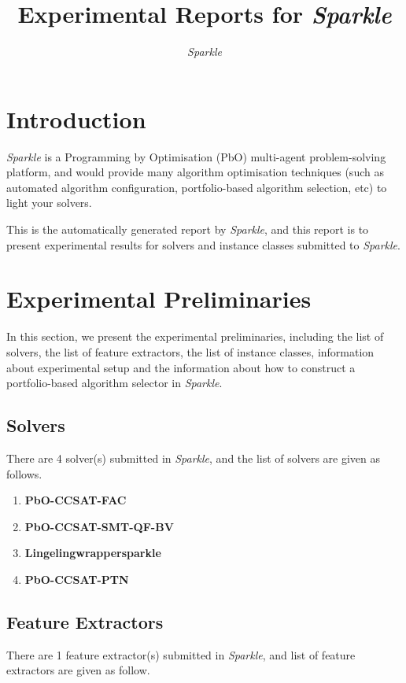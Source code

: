 \documentclass[british]{article}
\title{Experimental Reports for \emph{Sparkle} }
\author{ \emph{Sparkle} }
\begin{document}
\maketitle %


\section{Introduction}
\label{sec:Introduction}

\emph{Sparkle} \cite{Hoos15} is a Programming by Optimisation (PbO) \cite{Hoos12} multi-agent problem-solving platform, and would provide many algorithm optimisation techniques (such as automated algorithm configuration, portfolio-based algorithm selection, etc) to light your solvers. 

This is the automatically generated report by \emph{Sparkle}, and this report is to present experimental results for solvers and instance classes submitted to \emph{Sparkle}.


\section{Experimental Preliminaries}
\label{sec:Experimental_Preliminaries}

In this section, we present the experimental preliminaries, including the list of solvers, the list of feature extractors, the list of instance classes, information about experimental setup and the information about how to construct a portfolio-based algorithm selector in \emph{Sparkle}.

\subsection{Solvers}
\label{sec:Solvers}
There are 4 solver(s) submitted in \emph{Sparkle}, and the list of solvers are given as follows.


\begin{enumerate} 
\item \textbf{PbO-CCSAT-FAC}
\item \textbf{PbO-CCSAT-SMT-QF-BV}
\item \textbf{Lingeling\textunderscore wrapper\textunderscore sparkle}
\item \textbf{PbO-CCSAT-PTN}

\end{enumerate}


\subsection{Feature Extractors}
\label{sec:Feature_Extractors}
There are 1 feature extractor(s) submitted in \emph{Sparkle}, and list of feature extractors are given as follow.
\end{document}
